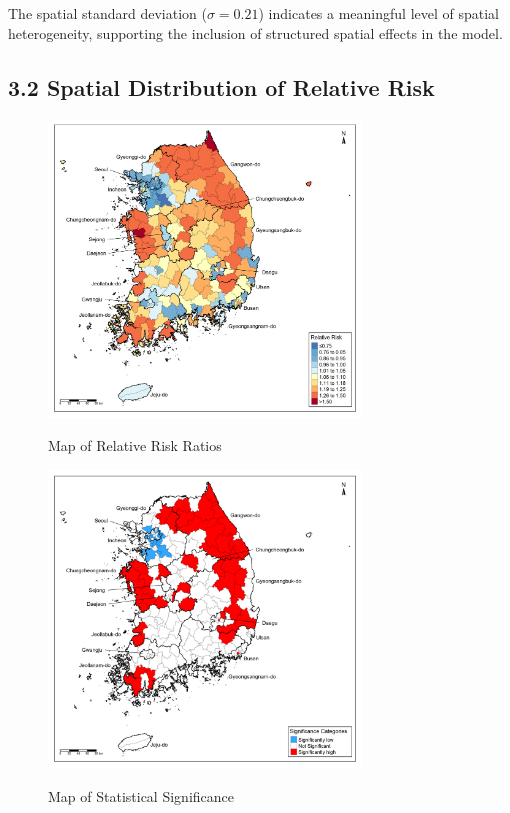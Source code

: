\documentclass[11pt]{article}
\begin{document}
	The spatial standard deviation ($\sigma = 0.21$) indicates a meaningful level of spatial heterogeneity, supporting the inclusion of structured spatial effects in the model.
	
	\newpage
	\subsection*{3.2 Spatial Distribution of Relative Risk}

	\vspace{-1em}

	\begin{figure}[H]
		\centering
		\caption{Map of Relative Risk Ratios}
		\includegraphics[width=0.74\textwidth]{assets/relative_risk/relative_risk_map_2022_annotated.png}
		\label{fig:relative_risk_map}
	\end{figure}

	\vspace{-2em}
	
	\begin{figure}[H]
		\centering
		\caption{Map of Statistical Significance}
		\includegraphics[width=0.74\textwidth]{assets/significance_categories/significance_categories_map_2022_annotated.png}
		\label{fig:significance_map}
	\end{figure}
\end{document}
